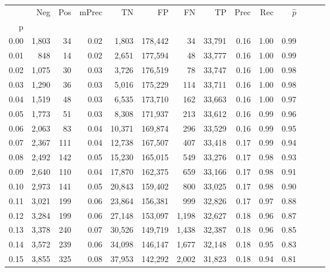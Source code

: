 \begin{tabular}{rrrrrrrrrrrrrr}
\toprule
{} &    Neg &  Pos & mPrec &       TN &       FP &      FN &      TP &  Prec &   Rec & $\hat{p}$ \\
p    &        &      &       &          &          &         &         &       &       &           \\
\midrule
0.00 &  1,803 &   34 &  0.02 &    1,803 &  178,442 &      34 &  33,791 &  0.16 &  1.00 &      0.99 \\
0.01 &    848 &   14 &  0.02 &    2,651 &  177,594 &      48 &  33,777 &  0.16 &  1.00 &      0.99 \\
0.02 &  1,075 &   30 &  0.03 &    3,726 &  176,519 &      78 &  33,747 &  0.16 &  1.00 &      0.98 \\
0.03 &  1,290 &   36 &  0.03 &    5,016 &  175,229 &     114 &  33,711 &  0.16 &  1.00 &      0.98 \\
0.04 &  1,519 &   48 &  0.03 &    6,535 &  173,710 &     162 &  33,663 &  0.16 &  1.00 &      0.97 \\
0.05 &  1,773 &   51 &  0.03 &    8,308 &  171,937 &     213 &  33,612 &  0.16 &  0.99 &      0.96 \\
0.06 &  2,063 &   83 &  0.04 &   10,371 &  169,874 &     296 &  33,529 &  0.16 &  0.99 &      0.95 \\
0.07 &  2,367 &  111 &  0.04 &   12,738 &  167,507 &     407 &  33,418 &  0.17 &  0.99 &      0.94 \\
0.08 &  2,492 &  142 &  0.05 &   15,230 &  165,015 &     549 &  33,276 &  0.17 &  0.98 &      0.93 \\
0.09 &  2,640 &  110 &  0.04 &   17,870 &  162,375 &     659 &  33,166 &  0.17 &  0.98 &      0.91 \\
0.10 &  2,973 &  141 &  0.05 &   20,843 &  159,402 &     800 &  33,025 &  0.17 &  0.98 &      0.90 \\
0.11 &  3,021 &  199 &  0.06 &   23,864 &  156,381 &     999 &  32,826 &  0.17 &  0.97 &      0.88 \\
0.12 &  3,284 &  199 &  0.06 &   27,148 &  153,097 &   1,198 &  32,627 &  0.18 &  0.96 &      0.87 \\
0.13 &  3,378 &  240 &  0.07 &   30,526 &  149,719 &   1,438 &  32,387 &  0.18 &  0.96 &      0.85 \\
0.14 &  3,572 &  239 &  0.06 &   34,098 &  146,147 &   1,677 &  32,148 &  0.18 &  0.95 &      0.83 \\
0.15 &  3,855 &  325 &  0.08 &   37,953 &  142,292 &   2,002 &  31,823 &  0.18 &  0.94 &      0.81 \\

\end{tabular}
